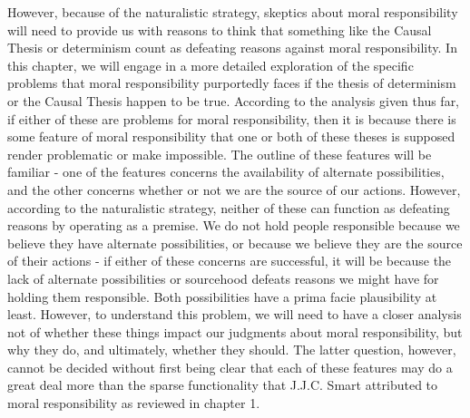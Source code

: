 \documentclass[phd,12pt,oneside,paper=letterpaper]{ubcthesis}
\begin{document}
However, because of the naturalistic strategy, skeptics about moral responsibility will need to provide us with reasons to think that something like the Causal Thesis or determinism count as defeating reasons against moral responsibility. In this chapter, we will engage in a more detailed exploration of the specific problems that moral responsibility purportedly faces if the thesis of determinism or the Causal Thesis happen to be true. According to the analysis given thus far, if either of these are problems for moral responsibility, then it is because there is some feature of moral responsibility that one or both of these theses is supposed render problematic or make impossible. The outline of these features will be familiar - one of the features concerns the availability of alternate possibilities, and the other concerns whether or not we are the source of our actions. However, according to the naturalistic strategy, neither of these can function as defeating reasons by operating as a premise. We do not hold people responsible because we believe they have alternate possibilities, or because we believe they are the source of their actions - if either of these concerns are successful, it will be because the lack of alternate possibilities or sourcehood defeats reasons we might have for holding them responsible. 
Both possibilities have a prima facie plausibility at least. However, to understand this problem, we will need to have a closer analysis not of whether these things impact our judgments about moral responsibility, but why they do, and ultimately, whether they should. The latter question, however, cannot be decided without first being clear that each of these features may do a great deal more than the sparse functionality that J.J.C. Smart attributed to moral responsibility as reviewed in chapter 1. 
\end{document}
